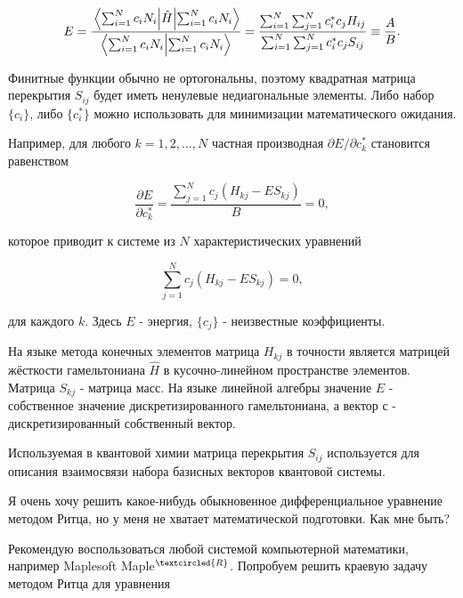 \documentclass{article}
\begin{document}
\begin{displaymath}
	E = \frac{\expval{\hat{H}}{\sum_{i=1}^{N} c_{i} N_{i}}}{\bra{\sum_{i=1}^{N} c_{i} N_{i}} \ket{\sum_{i=1}^{N} c_{i} N_{i}} } = \frac{\sum_{i=1}^{N} \sum_{j=1}^{N} c_{i}^{*} c_{j} H_{ij}}{\sum_{i=1}^{N} \sum_{j=1}^{N} c_{i}^{*} c_{j} S_{ij}} \equiv \frac{A}{B}.
\end{displaymath}

Финитные функции обычно не ортогональны, поэтому квадратная матрица перекрытия $S_{ij}$ будет иметь ненулевые недиагональные элементы. Либо набор $\{ c_{i} \}$, либо $\{ c_{i}^{*} \}$ можно использовать для минимизации математического ожидания.

Например, для любого $k = 1, 2, \dots, N$ частная производная $\partial E / \partial c_{k}^{*}$ становится равенством

\begin{displaymath}
	\frac{\partial E}{\partial c_{k}^{*}} = \frac{\sum_{j=1}^{N} c_{j} (H_{kj} - E S_{kj})}{B}= 0,
\end{displaymath}

\noindent которое приводит к системе из $N$ характеристических уравнений

\begin{displaymath}
	\sum_{j=1}^{N} c_{j} (H_{kj} - E S_{kj}) = 0,
\end{displaymath}

\noindent для каждого $k$. Здесь $E$ - энергия, $\{ c_{j} \}$ - неизвестные коэффициенты.

На языке метода конечных элементов матрица $H_{kj}$ в точности является матрицей жёсткости гамельтониана $\hat{H}$ в кусочно-линейном пространстве элементов.
Матрица $S_{kj}$ - матрица масс. На языке линейной алгебры значение $E$ - собственное значение дискретизированного гамельтониана, а вектор $с$ - дискретизированный собственный вектор.

\begin{info} %
	Используемая в квантовой химии матрица перекрытия $S_{ij}$ используется для описания взаимосвязи набора базисных векторов квантовой системы.
\end{info}

\newpage
\begin{question}
	Я очень хочу решить какое-нибудь обыкновенное дифференциальное уравнение методом Ритца, но у меня не хватает математической подготовки. Как мне быть?
\end{question}

Рекомендую воспользоваться любой системой компьютерной математики, например Maplesoft Maple$^{\textcircled{ \scriptsize R \normalsize} }$. Попробуем решить краевую задачу методом Ритца для уравнения
\end{document}
